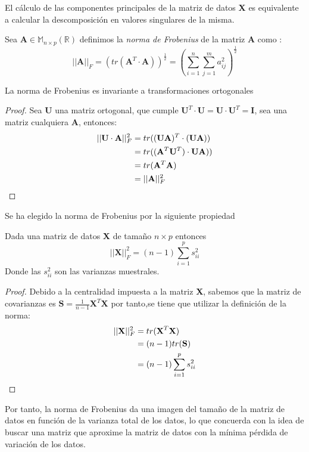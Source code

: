 \begin{coro}
El cálculo de las componentes principales de la matriz de datos \textbf{X} es equivalente a calcular la descomposición en valores singulares de la misma. 
\end {coro}

\begin{defi}
Sea $\textbf{A}\in \mathbb{M}_{n\times p}(\mathbb{R})$ definimos la \textit{norma de Frobenius} de la matriz \textbf{A} como :
\begin{equation}
||\textbf{A}||_F=(tr(\textbf{A}^T\cdot \textbf{A}))^{\frac{1}{2}}=\left(\sum_{i=1}^{n}\sum _{j=1}^{m}a_{ij}^2\right)^{\frac{1}{2}}
\end{equation}
\end{defi}

\begin{propo}
La norma de Frobenius es invariante a transformaciones ortogonales
\begin{proof}
Sea $\mathbf{U}$ una matriz ortogonal, que cumple $\mathbf{U}^T\cdot \mathbf{U}=\mathbf{U}\cdot \mathbf{U}^T=\textbf{I}$, sea una matriz cualquiera $\mathbf{A}$, entonces:
\begin{align*}
||\mathbf{U} \cdot \mathbf{A}||_F^2&=tr((\mathbf{U} \mathbf{A})^T\cdot(\mathbf{U} \mathbf{A}))\\
&=tr((\mathbf{A}^T \mathbf{U}^T)\cdot \mathbf{U} \mathbf{A}))\\
&=tr(\mathbf{A}^T \mathbf{A})\\
&=||\mathbf{A}||_F^2\qedhere
\end{align*}
\end{proof}
\end{propo}

\noindent Se ha elegido la norma de Frobenius por la siguiente propiedad
\begin{propo}
Dada una matriz de datos \textbf{X} de tamaño $n\times p$ entonces
\begin{equation}
||\textbf{X}||_F^2=(n-1)\sum_{i=1}^p s_{ii}^2
\end{equation}
Donde las $s_{ii}^2$ son las varianzas muestrales.
\begin{proof}
Debido a la centralidad impuesta a la matriz \textbf{X}, sabemos que la matriz de covarianzas es $\textbf{S}=\frac{1}{n-1}\textbf{X}^T \textbf{X}$ por tanto,se tiene que utilizar la definición de la norma:
\begin{align*}
||\textbf{X}||_F^2 &= tr(\textbf{X}^T\textbf{X})\\
&= (n-1) tr(\textbf{S})\\
&= (n-1) \sum_{i=1}^p s_{ii}^2 \qedhere
\end{align*}
\end{proof}
\end{propo}
\noindent Por tanto, la norma de Frobenius da una imagen del tamaño de la matriz de datos en función de la varianza total de los datos, lo que concuerda con la idea de buscar una matriz que aproxime la matriz de datos con la mínima pérdida de variación de los datos.  


